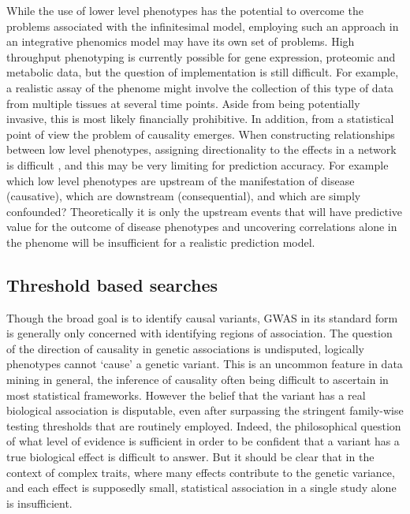 While the use of lower level phenotypes has the potential to overcome the problems associated with the infinitesimal model, employing such an approach in an integrative phenomics model may have its own set of problems. High throughput phenotyping is currently possible for gene expression, proteomic and metabolic data, but the question of implementation is still difficult. For example, a realistic assay of the phenome might involve the collection of this type of data from multiple tissues at several time points. Aside from being potentially invasive, this is most likely financially prohibitive. In addition, from a statistical point of view the problem of causality emerges. When constructing relationships between low level phenotypes, assigning directionality to the effects in a network is difficult \citep{Shipley2000}, and this may be very limiting for prediction accuracy. For example which low level phenotypes are upstream of the manifestation of disease (causative), which are downstream (consequential), and which are simply confounded? Theoretically it is only the upstream events that will have predictive value for the outcome of disease phenotypes \citep{Shipley2000} and uncovering correlations alone in the phenome will be insufficient for a realistic prediction model.


\subsection{Threshold based searches}

Though the broad goal is to identify causal variants, GWAS in its standard form is generally only concerned with identifying regions of association. The question of the direction of causality in genetic associations is undisputed, logically phenotypes cannot `cause' a genetic variant. This is an uncommon feature in data mining in general, the inference of causality often being difficult to ascertain in most statistical frameworks. However the belief that the variant has a real biological association is disputable, even after surpassing the stringent family-wise testing thresholds that are routinely employed. Indeed, the philosophical question of what level of evidence is sufficient in order to be confident that a variant has a true biological effect is difficult to answer. But it should be clear that in the context of complex traits, where many effects contribute to the genetic variance, and each effect is supposedly small, statistical association in a single study alone is insufficient.

